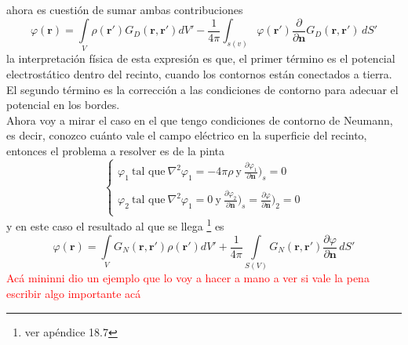 ahora es cuestión de sumar ambas contribuciones
\begin{equation*}
    \varphi(\textbf{r})= 
    \int\limits_{V} \rho(\textbf{r}')G_{D}(\textbf{r},\textbf{r}')dV'
    -\frac{1}{4\pi}\int_{s(v)} \varphi(\textbf{r}')
    \frac{\partial}{\partial \textbf{n}}G_{D}(\textbf{r},\textbf{r}')\,dS'
\end{equation*}
la interpretación física de esta expresión es que, el primer término es el potencial electrostático dentro del recinto, cuando los contornos están conectados a tierra. El segundo término es la corrección a las condiciones de contorno para adecuar el potencial en los bordes.\\
\indent Ahora voy a mirar el caso en el que tengo condiciones de contorno de Neumann, es decir, conozco cuánto vale el campo eléctrico en la superficie del recinto, entonces el problema a resolver es de la pinta
\begin{equation*}
    \left\{
        \begin{matrix}
            \varphi_{1}\ \mbox{tal que}\ 
            \nabla^{2}\varphi_{1} = -4\pi\rho\ \mbox{y}\ 
            \frac{\partial\varphi_{1}}{\partial \textbf{n}}\big)_{s} = 0\\
            \\
            \varphi_{2}\ \mbox{tal que}\ 
            \nabla^{2}\varphi_{1} = 0\ \mbox{y}\ \frac{\partial\varphi_{2}}{\partial \textbf{n}}\big)_{s} = \frac{\partial\varphi}{\partial \textbf{n}}\big)_{2} = 0\\
        \end{matrix}
    \right.
\end{equation*}
y en este caso el resultado al que se llega \footnote{ver apéndice 18.7} es
\begin{equation*}
    \varphi(\textbf{r})
    = 
    \int\limits_{V}G_{N}(\textbf{r},\textbf{r}')
    \rho(\textbf{r}')dV'
    +
    \frac{1}{4\pi}
    \int\limits_{S(V)}G_{N}(\textbf{r},\textbf{r}')
    \frac{\partial \varphi}{\partial \textbf{n}}\,dS'
\end{equation*}
\textcolor{red}{Acá mininni dio un ejemplo que lo voy a hacer a mano a ver si vale la pena escribir algo importante acá}





